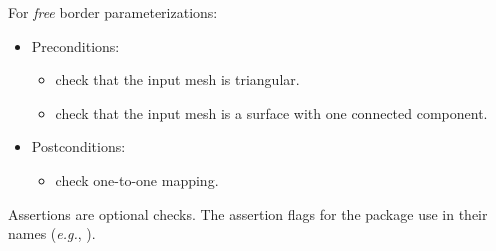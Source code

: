 For \emph{free} border parameterizations:
\begin{itemize}
\item Preconditions:
    \begin{itemize}
    \item check that the input mesh is triangular.
    \item check that the input mesh is a surface with one connected component.
    \end{itemize}
\item Postconditions:
    \begin{itemize}
    \item check one-to-one mapping.
    \end{itemize}
\end{itemize}

Assertions are optional checks. The assertion flags for the package
use  in their names (\textit{e.g.},
).



